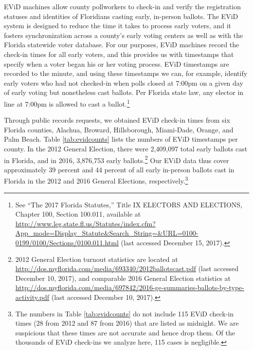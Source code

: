 \documentclass[12pt,titlepage]{article}
\begin{document}
EViD machines allow county pollworkers to check-in and verify the
registration statuses and identities of Floridians casting early,
in-person ballots. The EViD system is designed to reduce the time it
takes to process early voters, and it fosters synchronization across a
county's early voting centers as well as with the Florida statewide voter database.  For our purposes, EViD
machines record the check-in times for all early voters, and this
provides us with timestamps that specify when a voter began his or her
voting process. EViD timestamps are recorded to the minute, and using
these timestamps we can, for example, identify early voters who had
not checked-in when polls closed at 7:00pm on a given day of early
voting but nonetheless cast ballots.  Per Florida state law, any
elector in line at 7:00pm is allowed to cast a ballot.\footnote{See
  ``The 2017 Florida Statutes,'' Title IX ELECTORS AND ELECTIONS,
  Chapter 100, Section 100.011, available at
  \url{http://www.leg.state.fl.us/Statutes/index.cfm?App\_mode=Display\_Statute\&Search\_String=\&URL=0100-0199/0100/Sections/0100.011.html}
  (last accessed December 15, 2017).}

Through public records requests, we obtained EViD check-in times from
six Florida counties, Alachua, Broward, Hillsborough, Miami-Dade,
Orange, and Palm Beach. Table \ref{tab:evidcounts} lists the numbers
of EViD timestamps per county.  In the 2012 General Election, there
were 2,409,097 total early ballots cast in Florida, and in 2016,
3,876,753 early ballots.\footnote{2012 General Election turnout
  statistics are located at
  \url{http://dos.myflorida.com/media/693340/2012ballotscast.pdf}
  (last accessed December 10, 2017), and comparable 2016 General
  Election statistics at
  \url{http://dos.myflorida.com/media/697842/2016-ge-summaries-ballots-by-type-activity.pdf}
  (last accessed December 10, 2017).}  Our EViD data thus cover
approximately 39 percent and 44 percent of all early in-person ballots
cast in Florida in the 2012 and 2016 General Elections,
respectively.\footnote{The numbers in Table \ref{tab:evidcounts} do
  not include 115 EViD check-in times (28 from 2012 and 87 from 2016)
  that are listed as midnight.  We are suspicious that these times are
  not accurate and hence drop them.  Of the thousands of EViD
  check-ins we analyze here, 115 cases is
  negligible.\label{fn:midnight}}


\end{document}
